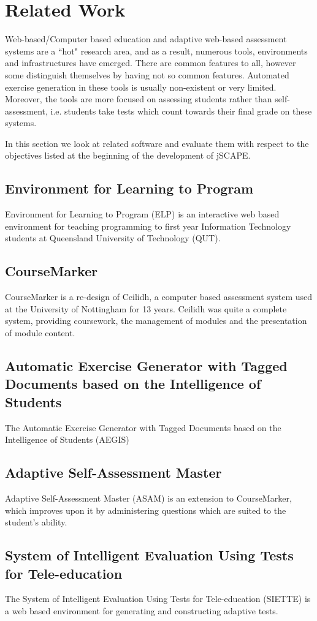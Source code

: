 \chapter{Related Work}
Web-based/Computer based education and adaptive web-based assessment systems are a ``hot" research area, and as a result, numerous tools, environments and infrastructures have emerged. There are common features to all, however some distinguish themselves by having not so common features.
Automated exercise generation in these tools is usually non-existent or very limited. Moreover, the tools are more focused on assessing students rather than self-assessment, i.e. students take tests which count towards their final grade on these systems.\newline

In this section we look at related software and evaluate them with respect to the objectives listed at the beginning of the development of jSCAPE.

\section{Environment for Learning to Program}
Environment for Learning to Program (ELP) is an interactive web based environment for teaching programming to first year Information Technology students at Queensland University of Technology (QUT).

\section{CourseMarker}
CourseMarker is a re-design of Ceilidh, a computer based assessment system used at the University of Nottingham for 13 years. Ceilidh was quite a complete system, providing coursework, the management of modules and the presentation of module content.

\section{Automatic Exercise Generator with Tagged Documents based on the Intelligence of Students}
The Automatic Exercise Generator with Tagged Documents based on the Intelligence of Students (AEGIS)

\section{Adaptive Self-Assessment Master}
Adaptive Self-Assessment Master (ASAM) is an extension to CourseMarker, which improves upon it by administering questions which are suited to the student's ability.

\section{System of Intelligent Evaluation Using Tests for Tele-education}
The System of Intelligent Evaluation Using Tests for Tele-education (SIETTE) is a web based environment for generating and constructing adaptive tests.